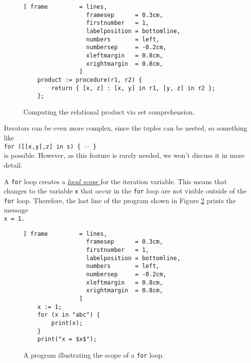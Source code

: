 \begin{figure}[!ht]
\centering
\begin{Verbatim}[ frame         = lines, 
                  framesep      = 0.3cm, 
                  firstnumber   = 1,
                  labelposition = bottomline,
                  numbers       = left,
                  numbersep     = -0.2cm,
                  xleftmargin   = 0.8cm,
                  xrightmargin  = 0.8cm,
                ]
    product := procedure(r1, r2) {
        return { [x, z] : [x, y] in r1, [y, z] in r2 };
    };
\end{Verbatim}
\vspace*{-0.3cm}
\caption{Computing the relational product via set comprehension.}
\label{fig:relational-product.stlx}
\end{figure}

Iterators can be even more complex, since the tuples can be nested, so something like
\\[0.2cm]
\hspace*{1.3cm}
\texttt{for ([[x,y],z] in s) \{ $\cdots$ \}}
\\[0.2cm]
is possible.  However, as this feature is rarely needed, we won't discuss it in more detail.


A \texttt{for} loop creates a 
\href{http://en.wikipedia.org/wiki/Variable_scope}{\emph{local scope} }
for the iteration variable.  This means that changes to the variable \texttt{x} that occur in the
\texttt{for} loop are not visible outside of the \texttt{for} loop.
Therefore, the last
line of the program shown in Figure \ref{fig:scope-for-loop.stlx} prints the message
\\[0.2cm]
\hspace*{1.3cm}
\texttt{x = 1.}

\begin{figure}[!ht]
\centering
\begin{Verbatim}[ frame         = lines, 
                  framesep      = 0.3cm, 
                  firstnumber   = 1,
                  labelposition = bottomline,
                  numbers       = left,
                  numbersep     = -0.2cm,
                  xleftmargin   = 0.8cm,
                  xrightmargin  = 0.8cm,
                ]
    x := 1;
    for (x in "abc") {
        print(x);
    }
    print("x = $x$");
\end{Verbatim}
\vspace*{-0.3cm}
\caption{A program illustrating the scope of a \texttt{for} loop.}
\label{fig:scope-for-loop.stlx}
\end{figure}




